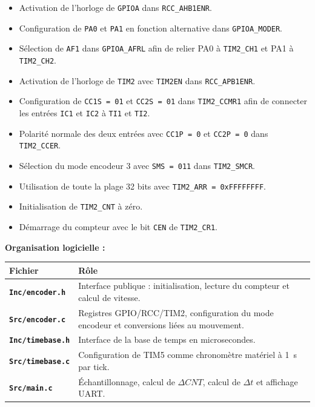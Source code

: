 \documentclass[11pt,a4paper]{article}
\begin{document}
\begin{sessionbox}
		\begin{itemize}
			\item Activation de l'horloge de \texttt{GPIOA} dans \texttt{RCC\_AHB1ENR}.
			\item Configuration de \texttt{PA0} et \texttt{PA1} en fonction alternative dans \texttt{GPIOA\_MODER}.
			\item Sélection de \texttt{AF1} dans \texttt{GPIOA\_AFRL} afin de relier PA0 à \texttt{TIM2\_CH1} et PA1 à \texttt{TIM2\_CH2}.
			\item Activation de l'horloge de \texttt{TIM2} avec \texttt{TIM2EN} dans \texttt{RCC\_APB1ENR}.
			\item Configuration de \texttt{CC1S = 01} et \texttt{CC2S = 01} dans \texttt{TIM2\_CCMR1} afin de connecter les entrées \texttt{IC1} et \texttt{IC2} à \texttt{TI1} et \texttt{TI2}.
			\item Polarité normale des deux entrées avec \texttt{CC1P = 0} et \texttt{CC2P = 0} dans \texttt{TIM2\_CCER}.
			\item Sélection du mode encodeur 3 avec \texttt{SMS = 011} dans \texttt{TIM2\_SMCR}.
			\item Utilisation de toute la plage 32 bits avec \texttt{TIM2\_ARR = 0xFFFFFFFF}.
			\item Initialisation de \texttt{TIM2\_CNT} à zéro.
			\item Démarrage du compteur avec le bit \texttt{CEN} de \texttt{TIM2\_CR1}.
		\end{itemize}
		
		\vspace{0.3cm}
		
		\textbf{Organisation logicielle :}
		
		\begin{center}
			\begin{tabular}{>{\bfseries}p{4cm}p{9cm}}
				\toprule
				Fichier & Rôle \\
				\midrule
				\texttt{Inc/encoder.h} & Interface publique : initialisation, lecture du compteur et calcul de vitesse. \\
				\texttt{Src/encoder.c} & Registres GPIO/RCC/TIM2, configuration du mode encodeur et conversions liées au mouvement. \\
				\texttt{Inc/timebase.h} & Interface de la base de temps en microsecondes. \\
				\texttt{Src/timebase.c} & Configuration de TIM5 comme chronomètre matériel à 1~\textmu s par tick. \\
				\texttt{Src/main.c} & Échantillonnage, calcul de $\Delta CNT$, calcul de $\Delta t$ et affichage UART. \\
				\bottomrule
			\end{tabular}
		\end{center}
		

\end{sessionbox}
\end{document}
